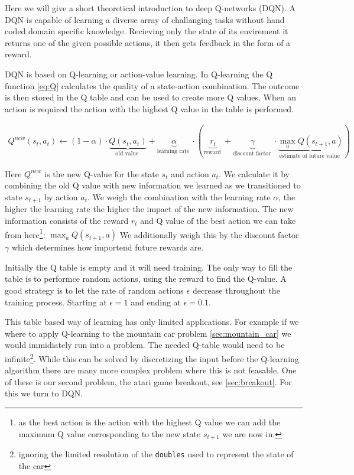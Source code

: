 Here we will give a short theoretical introduction to deep Q-networks (DQN). A DQN is capable of learning a diverse array of challanging tasks without hand coded domain specific knowledge. Recieving only the state of its envirement it returns one of the given possible actions, it then gets feedback in the form of a reward.

DQN is based on Q-learning or action-value learning. In Q-learning the Q function \autoref{eq:Q} calculates the quality of a state-action combination. The outcome is then stored in the Q table and can be used to create more Q values. When an action is required the action with the highest Q value in the table is performed.

\begin{align} \label{eq:Q}
Q^{n e w}\left(s_{t}, a_{t}\right) \leftarrow 
(1-\alpha)\cdot\underbrace{Q\left(s_{t}, a_{t}\right)}_{\text {old value }} 
%
+\underbrace{\alpha}_{\text {learning rate }} \cdot (\underbrace{r_{t}}_{\text {reward }}
+\underbrace{\gamma}_{\text {discount factor }} \cdot \underbrace{\max _{a} Q\left(s_{t+1}, a\right)}_{\text {estimate of future value }})
\end{align}

Here $Q^{new}$ is the new Q-value for the state $s_t$ and action $a_t$. We calculate it by combining the old Q value with new information we learned as we transitioned to state $s_{t+1}$ by action $a_t$. We weigh the combination with the learning rate $\alpha$, the higher the learning rate the higher the impact of the new information. The new information consists of the reward $r_t$ and Q value of the best action we can take from here\footnote{as the best action is the action with the highest Q value we can add the maximum Q value corrosponding to the new state $s_{t+1}$ we are now in.}: $\max _{a} Q\left(s_{t+1}, a\right)$ We additionally weigh this by the discount factor $\gamma$ which determines how importend future rewards are. 

Initially the Q table is empty and it will need training. The only way to fill the table is to performce random actions, using the reward to find the Q-value. A good strategy is to let the rate of random actions $\epsilon$ decrease throughout the training process. Starting at $\epsilon = 1$ and ending at $\epsilon = 0.1$.

This table based way of learning has only limited applications. For example if we where to apply Q-learning to the mountain car problem \autoref{sec:mountain_car} we would immidiately run into a problem. The needed Q-table would need to be infinite\footnote{ignoring the limited resolution of the \texttt{doubles} used to represent the state of the car}. While this can be solved by discretizing the input before the Q-learning algorithm there are many more complex problem where this is not feasable. One of these is our second problem, the atari game breakout, see \autoref{sec:breakout}. For this we turn to DQN.

